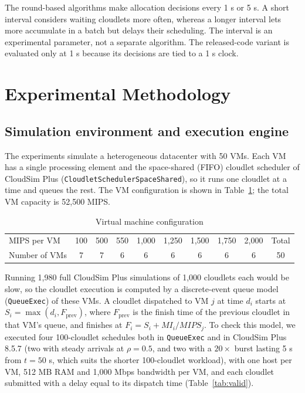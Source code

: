 \documentclass[default,sn-mathphys,Numbered]{sn-jnl}
\begin{document}
The round-based algorithms make allocation decisions every 1 s or 5 s. A short interval considers waiting cloudlets more often, whereas a longer interval lets more accumulate in a batch but delays their scheduling. The interval is an experimental parameter, not a separate algorithm. The released-code variant is evaluated only at 1 s because its decisions are tied to a 1 s clock.

\section{Experimental Methodology}\label{sec:method}

\subsection{Simulation environment and execution engine}\label{sec:engine}
The experiments simulate a heterogeneous datacenter with 50 VMs. Each VM has a single processing element and the space-shared (FIFO) cloudlet scheduler of CloudSim Plus (\texttt{CloudletSchedulerSpaceShared}), so it runs one cloudlet at a time and queues the rest. The VM configuration is shown in Table~\ref{tab:vms}; the total VM capacity is 52,500 MIPS.

\begin{table}[h]
\caption{Virtual machine configuration}\label{tab:vms}
\centering
\footnotesize
\setlength{\tabcolsep}{3pt}
\begin{tabular}{lccccccccc}
\toprule
MIPS per VM & 100 & 500 & 550 & 1,000 & 1,250 & 1,500 & 1,750 & 2,000 & Total \\
Number of VMs & 7 & 7 & 6 & 6 & 6 & 6 & 6 & 6 & 50 \\
\bottomrule
\end{tabular}
\end{table}

Running 1,980 full CloudSim Plus simulations of 1,000 cloudlets each would be slow, so the cloudlet execution is computed by a discrete-event queue model (\texttt{QueueExec}) of these VMs. A cloudlet dispatched to VM $j$ at time $d_i$ starts at $S_i = \max(d_i, F_{\text{prev}})$, where $F_{\text{prev}}$ is the finish time of the previous cloudlet in that VM's queue, and finishes at $F_i = S_i + \mathit{MI}_i/\mathit{MIPS}_j$. To check this model, we executed four 100-cloudlet schedules both in \texttt{QueueExec} and in CloudSim Plus 8.5.7 (two with steady arrivals at $\rho = 0.5$, and two with a $20\times$ burst lasting 5 s from $t = 50$ s, which suits the shorter 100-cloudlet workload), with one host per VM, 512 MB RAM and 1,000 Mbps bandwidth per VM, and each cloudlet submitted with a delay equal to its dispatch time (Table~\ref{tab:valid}).
\end{document}
